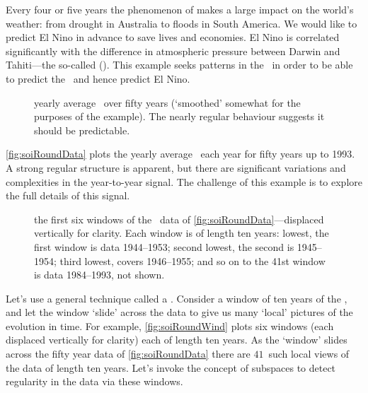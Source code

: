 \begin{example} \label{eg:orthbapp}
Every four or five years the phenomenon of  makes a large impact on the world's weather: from drought in Australia to floods in South America.
We would like to predict El Nino in advance to save lives and economies.
El Nino is correlated significantly with the difference in atmospheric pressure between Darwin and Tahiti---the so-called  (\soi).
This example seeks patterns in the \soi\ in order to be able to predict the \soi\ and hence predict El Nino.

\begin{figure}
\centering

\caption{yearly average \soi\ over fifty years (`smoothed' somewhat for the purposes of the example).  
The nearly regular behaviour suggests it should be predictable.}
\label{fig:soiRoundData}
\end{figure}

\autoref{fig:soiRoundData} plots the yearly average \soi\ each year for fifty years up to 1993.
A strong regular structure is apparent, but there are significant variations and complexities in the year-to-year signal.
The challenge of this example is to explore the full details of this signal.

\begin{figure}
\centering

\caption{the first six windows of the \soi\ data of \autoref{fig:soiRoundData}---displaced vertically for clarity. 
Each window is of length ten years: 
lowest, the first window is data 1944--1953;
second lowest, the second is 1945--1954;
third lowest, covers 1946--1955; 
and so on to the 41st window is data 1984--1993, not shown.}
\label{fig:soiRoundWind}
\end{figure}

Let's use a general technique called a .
Consider a window of ten years of the \soi, and let the window `slide' across the data to give us many `local' pictures of the evolution in time.
For example, \autoref{fig:soiRoundWind} plots six windows (each displaced vertically for clarity) each of length ten years.
As the `window' slides across the fifty year data of \autoref{fig:soiRoundData} there are \(41\)~such local views of the data of length ten years.
Let's invoke the concept of subspaces to detect regularity in the data via these windows.


\end{example}
